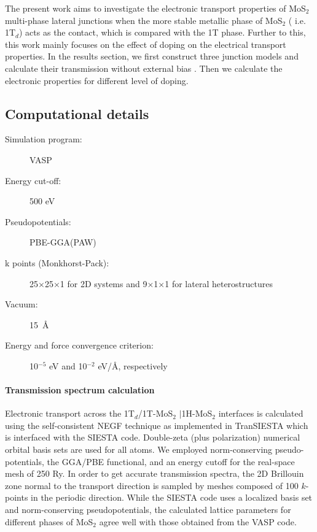 The present work aims to investigate the electronic transport properties of MoS$_2$ multi-phase lateral junctions when the more stable metallic phase of MoS$_2$ ( i.e. 1T$_d$) acts as the contact, which is compared with the 1T phase. Further to this, this work mainly focuses on the effect of doping on the electrical transport properties. In the results section, we first construct three junction models and calculate their transmission without external bias . Then we calculate the electronic properties for different level of doping.



\subsection{Computational details}


\begin{footnotesize}
\begin{description}
\item[Simulation program:] VASP
\item[Energy cut-off:] 500 eV
\item[Pseudopotentials:] PBE-GGA(PAW)
\item[k points (Monkhorst-Pack):] 25$\times$25$\times$1 for 2D systems and 9$\times$1$\times$1 for lateral heterostructures
\item[Vacuum:] 15~\AA
\item[Energy and force convergence criterion:] 10$^{-5}$ eV and 10$^{-2}$ eV/\AA, respectively
\end{description}
\end{footnotesize}


\paragraph{Transmission spectrum calculation} Electronic transport across the 1T$_d$/1T-MoS$_2$ $\mid$1H-MoS$_2$ interfaces is calculated using the self-consistent NEGF technique as implemented in TranSIESTA\cite{transiesta} which is interfaced with the SIESTA code.\cite{siesta} Double-zeta (plus polarization) numerical orbital basis sets are used for all atoms. We employed norm-conserving pseudo-potentials\cite{tm}, the GGA/PBE functional, and an energy cutoff for the real-space mesh of 250 Ry.  In order to get accurate transmission spectra, the 2D Brillouin zone normal to the transport direction is sampled by meshes composed of  100 $k$-points in the periodic direction. While the SIESTA code uses a localized basis set and norm-conserving pseudopotentials, the calculated lattice parameters for different phases of MoS$_2$ agree well with those obtained from the VASP code. 


